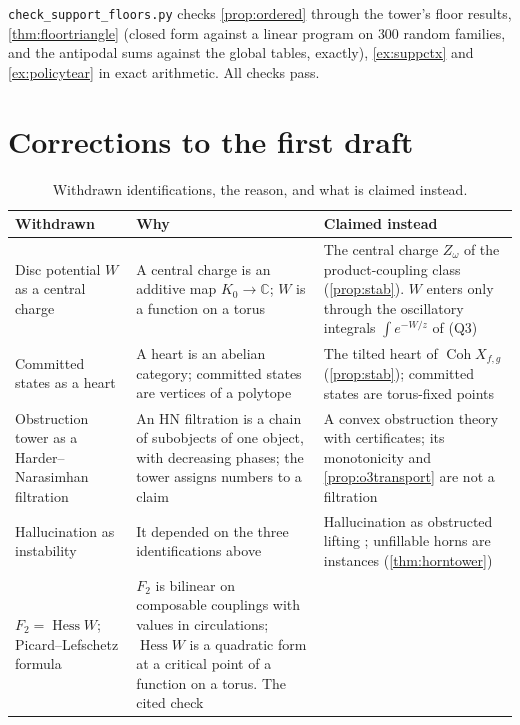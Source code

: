 \documentclass[11pt]{article}
\theoremstyle{definition}
\theoremstyle{remark}
\begin{document}
\texttt{check\_support\_floors.py} checks \cref{prop:ordered} through the tower's floor results, \cref{thm:floortriangle} (closed form against a linear program on $300$ random families, and the antipodal sums against the global tables, exactly), \cref{ex:suppctx} and \cref{ex:policytear} in exact arithmetic. All checks pass.

\appendix
\section{Corrections to the first draft}\label{sec:corrections}

\begin{table}[ht]
\centering\small
\caption{Withdrawn identifications, the reason, and what is claimed instead.}\label{tab:withdrawn}
\begin{tabular}{@{}R{0.2\textwidth}R{0.36\textwidth}R{0.38\textwidth}@{}}
\toprule
Withdrawn & Why & Claimed instead\\
\midrule
Disc potential $W$ as a central charge & A central charge is an additive map $K_0\to\mathbb C$; $W$ is a function on a torus &
The central charge $Z_\omega$ of the product-coupling class (\cref{prop:stab}). $W$ enters only through the oscillatory
integrals $\int e^{-W/z}$ of (Q3)\\\addlinespace[3pt]
Committed states as a heart & A heart is an abelian category; committed states are vertices of a polytope &
The tilted heart of $\operatorname{Coh}X_{f,g}$ (\cref{prop:stab}); committed states are torus-fixed points\\\addlinespace[3pt]
Obstruction tower as a Harder--Narasimhan filtration & An HN filtration is a chain of subobjects of one object, with
decreasing phases; the tower assigns numbers to a claim & A convex obstruction theory with certificates; its
monotonicity \cite[Thm.~10.5]{Awasthi-Tower} and \cref{prop:o3transport} are not a filtration\\\addlinespace[3pt]
Hallucination as instability & It depended on the three identifications above & Hallucination as obstructed lifting
\cite[Def.~10.17]{Awasthi-Tower}; unfillable horns are instances (\cref{thm:horntower})\\\addlinespace[3pt]
$F_2=\operatorname{Hess}W$; Picard--Lefschetz formula & $F_2$ is bilinear on composable couplings with values in
circulations; $\operatorname{Hess}W$ is a quadratic form at a critical point of a function on a torus. The cited check

\end{tabular}
\end{table}
\end{document}
